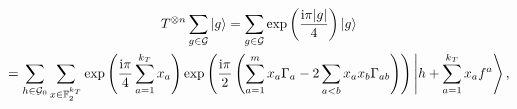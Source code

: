 \documentclass{article}
\begin{document}
\thispagestyle{empty}
\begin{multline*}
    T^{\otimes n}\sum_{g\in\mathcal{G}}\ket{g} = \sum_{g\in\mathcal{G}}\exp\left(\frac{\mathrm{i}\pi|g|}{4}\right)\ket{g} \\ = \sum_{h\in \mathcal{G}_0}\sum_{x\in\mathbb{F}_2^{k_T}}\exp\left(\frac{\mathrm{i}\pi}{4}\sum_{a=1}^{k_T} x_a\right)\exp\left(\frac{\mathrm{i}\pi}{2}\left(\sum_{a=1}^{m}x_a\Gamma_a-2\sum_{a<b}x_ax_b\Gamma_{ab}\right)\right)\Ket{h+\sum_{a=1}^{k_T}x_a f^a},
\end{multline*}
\end{document}
